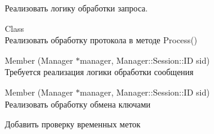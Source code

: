 \begin{DoxyRefList}
\label{todo__todo000012}%
%
Реализовать логику обработки запроса.  
\item[Class \doxylink{class_g_n_e_t_1_1_discount_announce}{GNET\+::Discount\+Announce} ]\hfill \\
\label{todo__todo000013}%
%
Реализовать обработку протокола в методе Process()  
\item[Member \doxylink{class_g_n_e_t_1_1_game2_a_u_a778ef1862d9abe838530c75c45882fb7}{GNET\+::Game2\+AU\+::Process} (Manager \texorpdfstring{$\ast$}{*}manager, Manager\+::\+Session\+::\+ID sid)]\hfill \\
\label{todo__todo000014}%
%
Требуется реализация логики обработки сообщения  
\item[Member \doxylink{class_g_n_e_t_1_1_key_exchange_a59d9dff58cb00261d155d622d24af391}{GNET\+::Key\+Exchange\+::Process} (Manager \texorpdfstring{$\ast$}{*}manager, Manager\+::\+Session\+::\+ID sid)]\hfill \\
\label{todo__todo000019}%
%
Реализовать обработку обмена ключами 



Добавить проверку временных меток 




\end{DoxyRefList}
